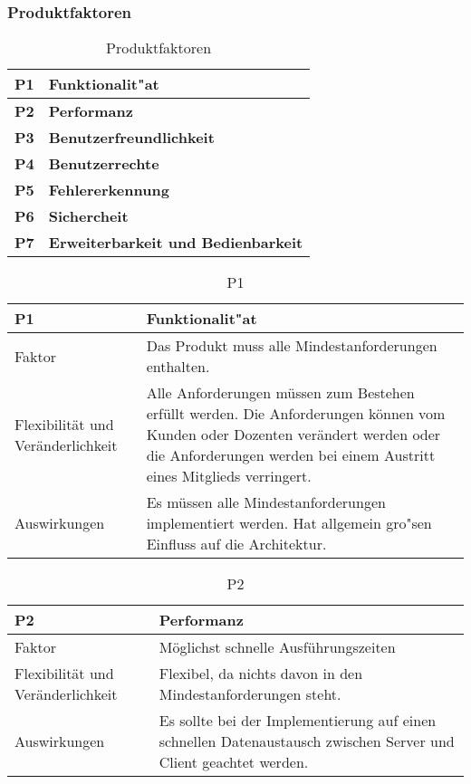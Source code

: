
\subsubsection{Produktfaktoren}
\label{sec:produktfaktoren}

\begin{table}[H]
\centering
\caption{Produktfaktoren}
\begin{tabular}{|l|l|} \hline
\textbf{P1} & \textbf{Funktionalit"at} \\ \hline
\textbf{P2} &  \textbf{Performanz}\\ \hline
\textbf{P3} &  \textbf{Benutzerfreundlichkeit} \\ \hline
\textbf{P4} &  \textbf{Benutzerrechte} \\ \hline
\textbf{P5} &  \textbf{Fehlererkennung} \\ \hline
\textbf{P6} &  \textbf{Sichercheit} \\ \hline
\textbf{P7} &  \textbf{Erweiterbarkeit und Bedienbarkeit} \\ \hline
\end{tabular}
\end{table}

\begin{table}[H]
\caption{P1}
\begin{tabular}{|p{3cm}|p{12cm}|}\hline
\textbf{P1} & \textbf{Funktionalit"at} \\ \hline \hline
Faktor & Das Produkt muss alle Mindestanforderungen enthalten.\\ \hline
Flexibilität und Veränderlichkeit & Alle Anforderungen müssen zum Bestehen erfüllt werden. Die Anforderungen können vom Kunden oder Dozenten verändert werden oder die Anforderungen werden bei einem Austritt eines Mitglieds verringert. \\ \hline
Auswirkungen & Es müssen alle Mindestanforderungen implementiert werden. Hat allgemein gro"sen Einfluss auf die Architektur.\\ \hline
\end{tabular}
\end{table}

\begin{table}[H]
\caption{P2}
\begin{tabular}{|p{3cm}|p{12cm}|}\hline
\textbf{P2} &  \textbf{Performanz}\\ \hline \hline
Faktor & Möglichst schnelle Ausführungszeiten\\ \hline
Flexibilität und Veränderlichkeit & Flexibel, da nichts davon in den Mindestanforderungen steht.\\ \hline
Auswirkungen & Es sollte bei der Implementierung auf einen schnellen Datenaustausch zwischen Server und Client geachtet werden. \\ \hline
\end{tabular}
\end{table}

